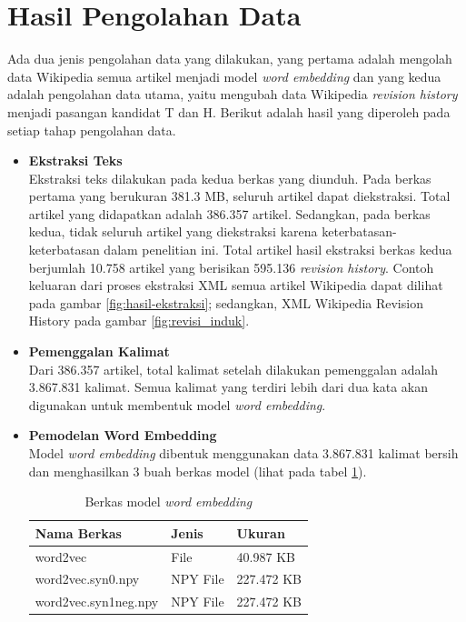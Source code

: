 \section{Hasil Pengolahan Data}
Ada dua jenis pengolahan data yang dilakukan, yang pertama adalah mengolah data Wikipedia semua artikel menjadi model \textit{word embedding} dan yang kedua adalah pengolahan data utama, yaitu mengubah data Wikipedia \textit{revision history} menjadi pasangan kandidat T dan H. Berikut adalah hasil yang diperoleh pada setiap tahap pengolahan data.
\begin{itemize}
	\item \textbf{Ekstraksi Teks }\\
	Ekstraksi teks dilakukan pada kedua berkas yang diunduh. Pada berkas pertama yang berukuran 381.3 MB, seluruh artikel dapat diekstraksi. Total artikel yang didapatkan adalah 386.357 artikel. Sedangkan, pada berkas kedua, tidak seluruh artikel yang diekstraksi karena keterbatasan-keterbatasan dalam penelitian ini. Total artikel hasil ekstraksi berkas kedua berjumlah 10.758 artikel yang berisikan 595.136 \textit{revision history}. Contoh keluaran dari proses ekstraksi XML semua artikel Wikipedia dapat dilihat pada gambar \ref{fig:hasil-ekstraksi}; sedangkan, XML Wikipedia Revision History pada gambar \ref{fig:revisi_induk}.
	
	\item \textbf{Pemenggalan Kalimat} \\
	Dari 386.357 artikel, total kalimat setelah dilakukan pemenggalan adalah 3.867.831 kalimat. Semua kalimat yang terdiri lebih dari dua kata akan digunakan untuk membentuk model \textit{word embedding}. 

	\item \textbf{Pemodelan Word Embedding} \\
	Model \textit{word embedding} dibentuk menggunakan data 3.867.831 kalimat bersih dan menghasilkan 3 buah berkas model (lihat pada tabel \ref{table:modelWE}).
	\begin{table}
		\centering
		\caption{Berkas model \textit{word embedding}}
		\label{table:modelWE}
		\begin{tabular}{|p{4cm}|p{2cm}|p{2.5cm}|}
			\hline
			Nama Berkas & Jenis & Ukuran \\ 
			\hline 
			word2vec   &  File  & 40.987 KB \\ \hline 
			word2vec.syn0.npy     & NPY File
			  & 
			227.472 KB \\ \hline
			word2vec.syn1neg.npy     & NPY File  & 
			227.472 KB \\ \hline
		\end{tabular}
	\end{table}
	

\end{itemize}
